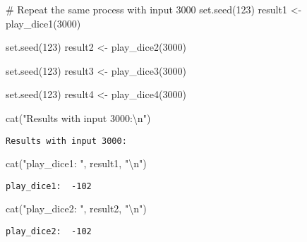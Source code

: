 \documentclass[
  letterpaper,
  DIV=11,
  numbers=noendperiod]{scrartcl}
\newenvironment{Shaded}{\begin{snugshade}}{\end{snugshade}}
\newcommand{\CommentTok}[1]{\textcolor[rgb]{0.37,0.37,0.37}{#1}}
\newcommand{\DecValTok}[1]{\textcolor[rgb]{0.68,0.00,0.00}{#1}}
\newcommand{\FunctionTok}[1]{\textcolor[rgb]{0.28,0.35,0.67}{#1}}
\newcommand{\NormalTok}[1]{\textcolor[rgb]{0.00,0.23,0.31}{#1}}
\newcommand{\OtherTok}[1]{\textcolor[rgb]{0.00,0.23,0.31}{#1}}
\newcommand{\SpecialCharTok}[1]{\textcolor[rgb]{0.37,0.37,0.37}{#1}}
\newcommand{\StringTok}[1]{\textcolor[rgb]{0.13,0.47,0.30}{#1}}
\begin{document}
\begin{Shaded}
\begin{Highlighting}[]
\CommentTok{\# Repeat the same process with input 3000}
\FunctionTok{set.seed}\NormalTok{(}\DecValTok{123}\NormalTok{)}
\NormalTok{result1 }\OtherTok{\textless{}{-}} \FunctionTok{play\_dice1}\NormalTok{(}\DecValTok{3000}\NormalTok{)}

\FunctionTok{set.seed}\NormalTok{(}\DecValTok{123}\NormalTok{)}
\NormalTok{result2 }\OtherTok{\textless{}{-}} \FunctionTok{play\_dice2}\NormalTok{(}\DecValTok{3000}\NormalTok{)}

\FunctionTok{set.seed}\NormalTok{(}\DecValTok{123}\NormalTok{)}
\NormalTok{result3 }\OtherTok{\textless{}{-}} \FunctionTok{play\_dice3}\NormalTok{(}\DecValTok{3000}\NormalTok{)}

\FunctionTok{set.seed}\NormalTok{(}\DecValTok{123}\NormalTok{)}
\NormalTok{result4 }\OtherTok{\textless{}{-}} \FunctionTok{play\_dice4}\NormalTok{(}\DecValTok{3000}\NormalTok{)}

\FunctionTok{cat}\NormalTok{(}\StringTok{"Results with input 3000:}\SpecialCharTok{\textbackslash{}n}\StringTok{"}\NormalTok{)}
\end{Highlighting}
\end{Shaded}

\begin{verbatim}
Results with input 3000:
\end{verbatim}

\begin{Shaded}
\begin{Highlighting}[]
\FunctionTok{cat}\NormalTok{(}\StringTok{"play\_dice1: "}\NormalTok{, result1, }\StringTok{"}\SpecialCharTok{\textbackslash{}n}\StringTok{"}\NormalTok{)}
\end{Highlighting}
\end{Shaded}

\begin{verbatim}
play_dice1:  -102 
\end{verbatim}

\begin{Shaded}
\begin{Highlighting}[]
\FunctionTok{cat}\NormalTok{(}\StringTok{"play\_dice2: "}\NormalTok{, result2, }\StringTok{"}\SpecialCharTok{\textbackslash{}n}\StringTok{"}\NormalTok{)}
\end{Highlighting}
\end{Shaded}

\begin{verbatim}
play_dice2:  -102 
\end{verbatim}
\end{document}
